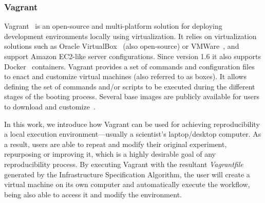\subsubsection{Vagrant}

Vagrant~\cite{palat2012introducing} is an open-source and multi-platform solution for deploying 
development environments locally using virtualization. It relies on virtualization solutions such as 
Oracle VirtualBox~\cite{Watson2008} (also open-source) or  VMWare~\cite{vmware}, and support 
Amazon EC2-like server configurations. Since version 1.6 it also supports Docker~\cite{Merkel2014} 
containers.
Vagrant provides a set of commands and configuration files to enact and customize virtual machines
(also referred to as boxes). It allows defining the set of commands and/or scripts to be executed during 
the different stages of the booting process. Several base images are publicly available for users to 
download and customize~\cite{vagrantbox}. 
 
In this work, we introduce how Vagrant can be used for achieving reproducibility  a local execution
environment---usually a scientist's laptop/desktop computer. As a result, users are able to repeat and 
modify their original experiment, repurposing or improving it, which is a highly desirable goal of any 
reproducibility process. By executing Vagrant with the resultant {\it Vagrantfile} generated by the Infrastructure Specification Algorithm, 
the user will create a virtual machine on its own computer and automatically execute the workflow, 
being also able to access it and modify the environment.




